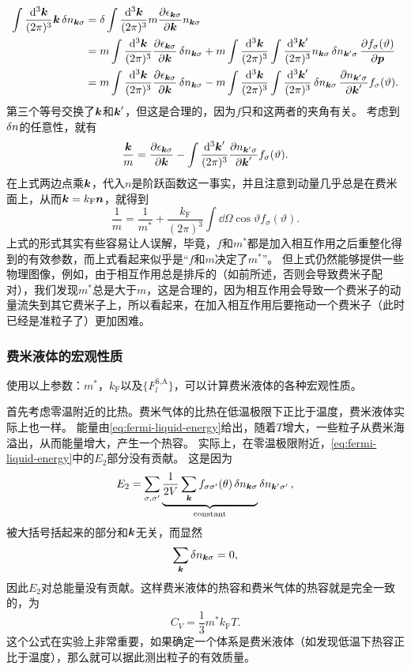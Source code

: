 \documentclass[hyperref, UTF8, a4paper]{ctexart}
\begin{document}
\[
    \begin{aligned}
        \int \frac{\dd[3]{\vb*{k}}}{(2\pi)^3} \vb*{k} \var{n_{\vb*{k} \sigma}} &= \var \int \frac{\dd[3]{\vb*{k}}}{(2\pi)^3} m \pdv{\epsilon_{\vb*{k} \sigma}}{\vb*{k}} n_{\vb*{k} \sigma} \\
        &= m \int \frac{\dd[3]{\vb*{k}}}{(2\pi)^3} \pdv{\epsilon_{\vb*{k} \sigma}}{\vb*{k}} \var{n_{\vb*{k} \sigma}} + m \int \frac{\dd[3]{\vb*{k}}}{(2\pi)^3} \int \frac{\dd[3]{\vb*{k}'}}{(2\pi)^3} n_{\vb*{k} \sigma} \var{n_{\vb*{k}' \sigma}} \pdv{f_{\sigma}(\vartheta)}{\vb*{p}} \\
        &= m \int \frac{\dd[3]{\vb*{k}}}{(2\pi)^3} \pdv{\epsilon_{\vb*{k} \sigma}}{\vb*{k}} \var{n_{\vb*{k} \sigma}} - m \int \frac{\dd[3]{\vb*{k}}}{(2\pi)^3} \int \frac{\dd[3]{\vb*{k}'}}{(2\pi)^3} \var{n_{\vb*{k} \sigma}} \pdv{n_{\vb*{k}' \sigma}}{\vb*{k}'} f_{\sigma}(\vartheta) .
    \end{aligned}
\]
第三个等号交换了$\vb*{k}$和$\vb*{k}'$，但这是合理的，因为$f$只和这两者的夹角有关。
考虑到$\var{n}$的任意性，就有
\[
    \frac{\vb*{k}}{m} = \pdv{\epsilon_{\vb*{k} \sigma}}{\vb*{k}} - \int \frac{\dd[3]{\vb*{k}'}}{(2\pi)^3} \pdv{n_{\vb*{k}' \sigma}}{\vb*{k}'} f_{\sigma}(\vartheta).
\]
在上式两边点乘$\vb*{k}$，代入$n$是阶跃函数这一事实，并且注意到动量几乎总是在费米面上，从而$\vb*{k} = k_\text{F} \vb*{n}$，就得到
\begin{equation}
    \frac{1}{m} = \frac{1}{m^*} + \frac{k_\text{F}}{(2\pi)^3} \int \dd{\Omega} \cos \vartheta f_\sigma(\vartheta).
\end{equation}
上式的形式其实有些容易让人误解，毕竟，$f$和$m^*$都是加入相互作用之后重整化得到的有效参数，而上式看起来似乎是“$f$和$m$决定了$m^*$”。
但上式仍然能够提供一些物理图像，例如，由于相互作用总是排斥的（如前所述，否则会导致费米子配对），我们发现$m^*$总是大于$m$，这是合理的，因为相互作用会导致一个费米子的动量流失到其它费米子上，所以看起来，在加入相互作用后要拖动一个费米子（此时已经是准粒子了）更加困难。

\subsubsection{费米液体的宏观性质}

使用以上参数：$m^*$，$k_\text{F}$以及$\{F_l^\text{S,A}\}$，可以计算费米液体的各种宏观性质。

首先考虑零温附近的比热。费米气体的比热在低温极限下正比于温度，费米液体实际上也一样。
能量由\eqref{eq:fermi-liquid-energy}给出，随着$T$增大，一些粒子从费米海溢出，从而能量增大，产生一个热容。
实际上，在零温极限附近，\eqref{eq:fermi-liquid-energy}中的$E_2$部分没有贡献。
这是因为
\[
    E_2 = \sum_{\sigma, \sigma'} \underbrace{\frac{1}{2V} \sum_{\vb*{k}} f_{\sigma \sigma'}(\theta) \var{n}_{\vb*{k} \sigma}}_{\text{constant}} \var{n}_{\vb*{k}' \sigma'},
\]
被大括号括起来的部分和$\vb*{k}$无关，而显然
\[
    \sum_{\vb*{k}} \var{n}_{\vb*{k} \sigma} = 0,
\]
因此$E_2$对总能量没有贡献。这样费米液体的热容和费米气体的热容就是完全一致的，为
\begin{equation}
    C_V = \frac{1}{3} m^* k_\text{F} T.
\end{equation}
这个公式在实验上非常重要，如果确定一个体系是费米液体（如发现低温下热容正比于温度），那么就可以据此测出粒子的有效质量。
\end{document}
